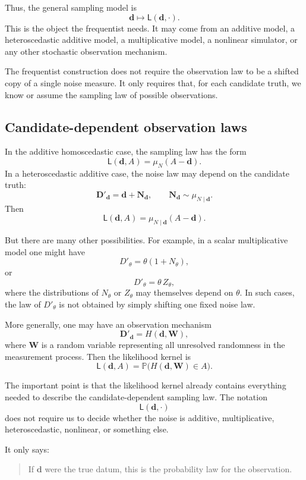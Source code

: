 \documentclass[11pt]{article}
\newcommand{\muN}{\mu_N}
\newcommand{\Dobsrand}{\mathbf D'}
\newcommand{\Nrand}{\mathbf N}
\newcommand{\Prob}{\mathbb P}
\begin{document}
Thus, the general sampling model is
\[
    \mathbf d
    \longmapsto
    \mathsf L(\mathbf d,\cdot).
\]
This is the object the frequentist needs. It may come from an additive model, a heteroscedastic additive model, a multiplicative model, a nonlinear simulator, or any other stochastic observation mechanism.

The frequentist construction does not require the observation law to be a shifted copy of a single noise measure. It only requires that, for each candidate truth, we know or assume the sampling law of possible observations.

\subsection{Candidate-dependent observation laws}

In the additive homoscedastic case, the sampling law has the form
\[
    \mathsf L(\mathbf d,A)
    =
    \muN(A-\mathbf d).
\]
In a heteroscedastic additive case, the noise law may depend on the candidate truth:
\[
    \Dobsrand_{\mathbf d}
    =
    \mathbf d+\Nrand_{\mathbf d},
    \qquad
    \Nrand_{\mathbf d}\sim\mu_{N\mid\mathbf d}.
\]
Then
\[
    \mathsf L(\mathbf d,A)
    =
    \mu_{N\mid\mathbf d}(A-\mathbf d).
\]

But there are many other possibilities. For example, in a scalar multiplicative model one might have
\[
    D'_{\theta}
    =
    \theta(1+N_{\theta}),
\]
or
\[
    D'_{\theta}
    =
    \theta\,Z_{\theta},
\]
where the distributions of \(N_{\theta}\) or \(Z_{\theta}\) may themselves depend on \(\theta\). In such cases, the law of \(D'_{\theta}\) is not obtained by simply shifting one fixed noise law.

More generally, one may have an observation mechanism
\[
    \Dobsrand_{\mathbf d}
    =
    H(\mathbf d,\mathbf W),
\]
where \(\mathbf W\) is a random variable representing all unresolved randomness in the measurement process. Then the likelihood kernel is
\[
    \mathsf L(\mathbf d,A)
    =
    \Prob\bigl(H(\mathbf d,\mathbf W)\in A\bigr).
\]

The important point is that the likelihood kernel already contains everything needed to describe the candidate-dependent sampling law. The notation
\[
    \mathsf L(\mathbf d,\cdot)
\]
does not require us to decide whether the noise is additive, multiplicative, heteroscedastic, nonlinear, or something else.

It only says:
\begin{quote}
    If \(\mathbf d\) were the true datum, this is the probability law for the observation.
\end{quote}
\end{document}
